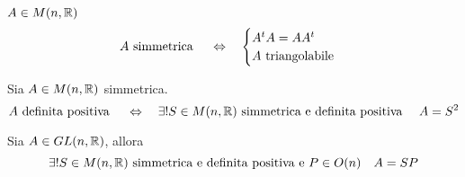 \spazio
\begin{prop}$A \in M(n,\mathbb{R})$ 
$$ A \text{ simmetrica } \quad \Leftrightarrow \quad \begin{cases}
A^t A = A A^t \\
A \text{ triangolabile}
\end{cases}$$
\end{prop}
\spazio
\begin{prop}\bianco
Sia $A\in M(n,\mathbb{R}) $ simmetrica.\\
$$ A \text{ definita positiva } \quad \Leftrightarrow \quad \exists ! S \in M(n,\mathbb{R}) \text{ simmetrica e definita positiva } \quad A = S^2 $$ 
\end{prop}
\spazio
\begin{prop}\bianco
Sia $A \in GL(n,\mathbb{R}) $, allora
$$ \exists ! S \in M(n,\mathbb{R}) \text{ simmetrica e definita positiva  e } P \in O(n) \quad A = SP $$
\end{prop}
%
